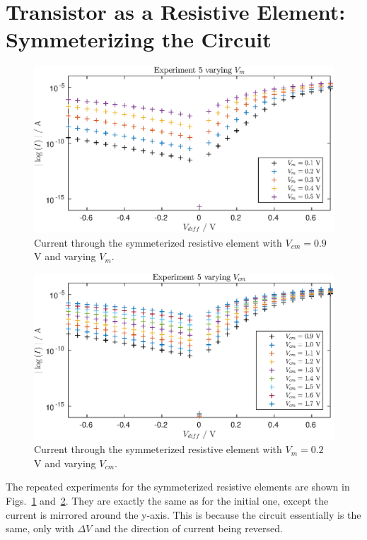 \section{Transistor as a Resistive Element: Symmeterizing the Circuit}
\begin{figure}
    \center
    \includegraphics{exp53.eps}
    \caption{Current through the symmeterized resistive element with $V_{cm} = 0.9$ V and varying $V_m$.}
    \label{fig:exp53}
\end{figure}
\begin{figure}
    \center
    \includegraphics{exp54.eps}
    \caption{Current through the symmeterized resistive element with $V_m = 0.2$ V and varying $V_{cm}$.}
    \label{fig:exp54}
\end{figure}
The repeated experiments for the symmeterized resistive elements are shown in Figs.~\ref{fig:exp53} and~\ref{fig:exp54}. 
They are exactly the same as for the initial one, except the current is mirrored around the y-axis. This is because the
circuit essentially is the same, only with \(\Delta V\) and the direction of current being reversed.


